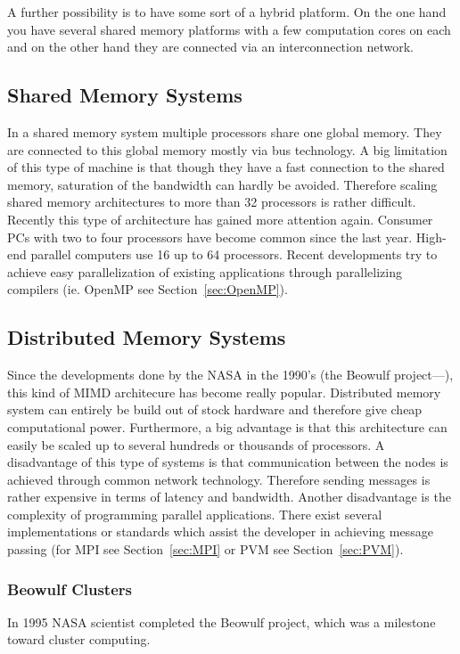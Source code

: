 A further possibility is to have some sort of a hybrid platform. On
the one hand you have several shared memory platforms with a few
computation cores on each and on the other hand they are connected via
an interconnection network. 

\subsection{Shared Memory Systems}
\label{sec:sharedmemorysystems}
In a shared memory system multiple processors share one global
memory. They are connected to this global memory mostly via bus
technology. A big limitation of this type of machine is that though they have
a fast connection to the shared memory, saturation of the bandwidth can
hardly be avoided. Therefore scaling shared memory architectures to
more than 32 processors is rather difficult. Recently this type of
architecture has gained more attention again. Consumer PCs with two to four
processors have become common since the last year. High-end parallel
computers use 16 up to 64 processors. Recent developments try to
achieve easy parallelization of existing applications through
parallelizing compilers (ie. OpenMP see Section~\ref{sec:OpenMP}).

\subsection{Distributed Memory Systems}
\label{sec:distributedmemorysystems}
Since the developments done by the NASA in the 1990's (the Beowulf
project---\cite{becker95bpw}),
this kind of MIMD architecure has become really popular.
Distributed memory system can
entirely be build out of stock hardware and therefore give cheap
computational power. Furthermore, a big advantage is that this
architecture can easily be scaled up to several hundreds or thousands
of processors. A disadvantage of this type of systems is that
communication between the nodes is achieved through common network
technology. Therefore sending messages is rather expensive in terms of
latency and bandwidth. Another disadvantage is the complexity of
programming parallel applications. There exist several implementations
or standards which assist the developer in achieving message passing
(for MPI see Section~\ref{sec:MPI} or PVM see Section~\ref{sec:PVM}).

\subsubsection{Beowulf Clusters}
In 1995 NASA scientist completed the Beowulf project, which was a
milestone toward cluster computing.


